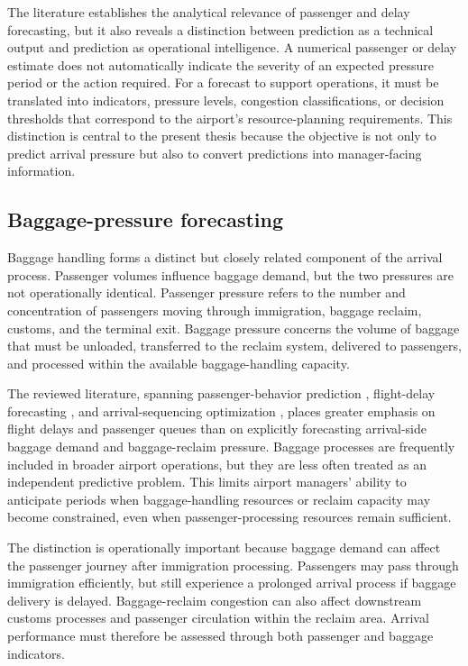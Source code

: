 The literature establishes the analytical relevance of passenger and delay forecasting, but it also reveals a distinction between prediction as a technical output and prediction as operational intelligence. A numerical passenger or delay estimate does not automatically indicate the severity of an expected pressure period or the action required. For a forecast to support operations, it must be translated into indicators, pressure levels, congestion classifications, or decision thresholds that correspond to the airport's resource-planning requirements. This distinction is central to the present thesis because the objective is not only to predict arrival pressure but also to convert predictions into manager-facing information.

\subsection{Baggage-pressure forecasting}
\label{subsec:baggage-pressure-forecasting}

Baggage handling forms a distinct but closely related component of the arrival process. Passenger volumes influence baggage demand, but the two pressures are not operationally identical. Passenger pressure refers to the number and concentration of passengers moving through immigration, baggage reclaim, customs, and the terminal exit. Baggage pressure concerns the volume of baggage that must be unloaded, transferred to the reclaim system, delivered to passengers, and processed within the available baggage-handling capacity.

The reviewed literature, spanning passenger-behavior prediction \parencite{orsini2019neural}, flight-delay forecasting \parencite{shao2019flight,shao2022predicting,zhang2021spatiotemporal,zhu2024spatiotemporal}, and arrival-sequencing optimization \parencite{pang2024machine}, places greater emphasis on flight delays and passenger queues than on explicitly forecasting arrival-side baggage demand and baggage-reclaim pressure. Baggage processes are frequently included in broader airport operations, but they are less often treated as an independent predictive problem. This limits airport managers' ability to anticipate periods when baggage-handling resources or reclaim capacity may become constrained, even when passenger-processing resources remain sufficient.

The distinction is operationally important because baggage demand can affect the passenger journey after immigration processing. Passengers may pass through immigration efficiently, but still experience a prolonged arrival process if baggage delivery is delayed. Baggage-reclaim congestion can also affect downstream customs processes and passenger circulation within the reclaim area. Arrival performance must therefore be assessed through both passenger and baggage indicators.

